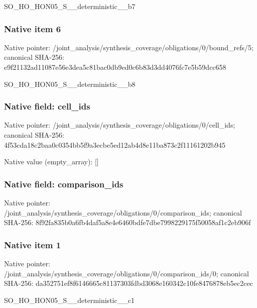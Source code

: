 \documentclass[10pt,a4paper]{article}
\begin{document}
\begingroup\raggedright\sloppy SO\_\allowbreak{}HO\_\allowbreak{}HON05\_\allowbreak{}S\_\allowbreak{}\_\allowbreak{}deterministic\_\allowbreak{}\_\allowbreak{}b7\par\endgroup

\subsubsection{Native item 6}
Native pointer: /joint\_\allowbreak{}analysis/synthesis\_\allowbreak{}coverage/obligations/0/bound\_\allowbreak{}refs/5; canonical SHA-256: e9f21132ad11087e56e3dea5c81bac0db9ed0c6b83d3dd4076fc7e5b59dcc658

\begingroup\raggedright\sloppy SO\_\allowbreak{}HO\_\allowbreak{}HON05\_\allowbreak{}S\_\allowbreak{}\_\allowbreak{}deterministic\_\allowbreak{}\_\allowbreak{}b8\par\endgroup

\subsubsection{Native field: cell\_\allowbreak{}ids}
Native pointer: /joint\_\allowbreak{}analysis/synthesis\_\allowbreak{}coverage/obligations/0/cell\_\allowbreak{}ids; canonical SHA-256: 4f53cda18c2baa0c0354bb5f9a3ecbe5ed12ab4d8e11ba873c2f11161202b945

Native value (empty\_\allowbreak{}array): []

\subsubsection{Native field: comparison\_\allowbreak{}ids}
Native pointer: /joint\_\allowbreak{}analysis/synthesis\_\allowbreak{}coverage/obligations/0/comparison\_\allowbreak{}ids; canonical SHA-256: 8f92fa835b0a6fb4daf5a8e4e6460bdfe7dbe7998229175f50058af1c2eb906f

\subsubsection{Native item 1}
Native pointer: /joint\_\allowbreak{}analysis/synthesis\_\allowbreak{}coverage/obligations/0/comparison\_\allowbreak{}ids/0; canonical SHA-256: da352751ef8f6146665c81137303fdbd3068e160342c10fe8476878eb5ec2cec

\begingroup\raggedright\sloppy SO\_\allowbreak{}HO\_\allowbreak{}HON05\_\allowbreak{}S\_\allowbreak{}\_\allowbreak{}deterministic\_\allowbreak{}\_\allowbreak{}c1\par\endgroup
\end{document}
